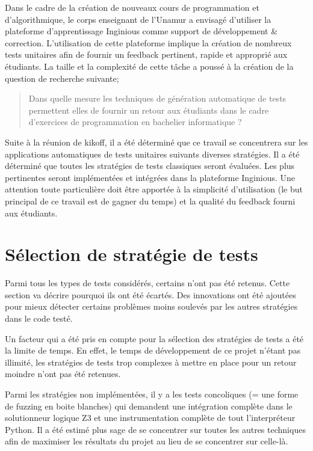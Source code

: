 \documentclass[a4paper]{report}
\begin{document}
Dans le cadre de la création de nouveaux cours de programmation et d'algorithmique, le corps enseignant de l’Unamur a envisagé d'utiliser la plateforme d'apprentissage Inginious comme support de développement \& correction.
L'utilisation de cette plateforme implique la création de nombreux tests unitaires afin de fournir un feedback pertinent, rapide et approprié aux étudiants.
La taille et la complexité de cette tâche a poussé à la création de la question de recherche suivante;
\begin{quote}
Dans quelle mesure les techniques de génération automatique de tests permettent elles de fournir un retour aux étudiants dans le cadre d'exercices de programmation en bachelier informatique ?
\end{quote}

Suite à la réunion de kikoff, il a été déterminé que ce travail se concentrera sur les applications automatiques de tests unitaires suivants diverses stratégies.
Il a été déterminé que toutes les stratégies de tests classiques seront évaluées.
Les plus pertinentes seront implémentées et intégrées dans la plateforme Inginious.
Une attention toute particulière doit être apportée à la simplicité d’utilisation (le but principal de ce travail est de gagner du temps) et la qualité du feedback fourni aux étudiants.
 
 
\section{Sélection de stratégie de tests}

Parmi tous les types de tests considérés, certains n'ont pas été retenus.
Cette section va décrire pourquoi ils ont été écartés.
Des innovations ont été ajoutées pour mieux détecter certains problèmes moins soulevés par les autres stratégies dans le code testé.

Un facteur qui  a été pris en compte pour la sélection des stratégies de tests a été la limite de temps.
En effet, le temps de développement de ce projet n'étant pas illimité, les stratégies de tests trop complexes à mettre en place pour un retour moindre n'ont pas été retenues.

Parmi les stratégies non implémentées, il y a les tests concoliques (= une forme de fuzzing en boite blanches) qui demandent une intégration complète dans le solutionneur logique Z3 et une instrumentation complète de tout l'interpréteur Python.
Il a été estimé plus sage de se concentrer sur toutes les autres techniques afin de maximiser les résultats du projet au lieu de se concentrer sur celle-là.
\end{document}
